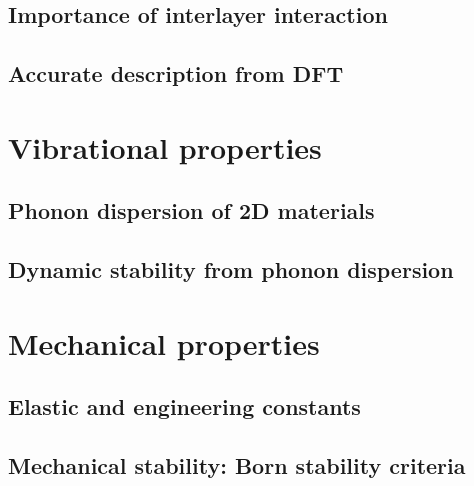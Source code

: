 \subsection{Importance of interlayer interaction}
\subsection{Accurate description from DFT}

\section{Vibrational properties}
\subsection{Phonon dispersion of 2D materials}
\subsection{Dynamic stability from phonon dispersion}

\section{Mechanical properties}
\subsection{Elastic and engineering constants}
\subsection{Mechanical stability: Born stability criteria}